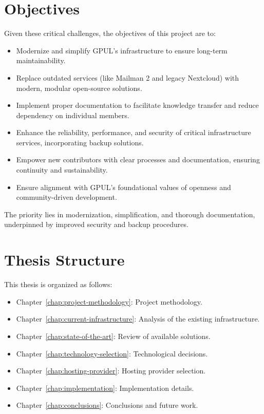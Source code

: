 \section{Objectives}

Given these critical challenges, the objectives of this project are to:

\begin{itemize}
    \item Modernize and simplify GPUL's infrastructure to ensure long-term maintainability.
    \item Replace outdated services (like Mailman 2 and legacy Nextcloud) with modern, modular open-source solutions.
    \item Implement proper documentation to facilitate knowledge transfer and reduce dependency on individual members.
    \item Enhance the reliability, performance, and security of critical infrastructure services, incorporating backup solutions.
    \item Empower new contributors with clear processes and documentation, ensuring continuity and sustainability.
    \item Ensure alignment with GPUL's foundational values of openness and community-driven development.
\end{itemize}

The priority lies in modernization, simplification, and thorough documentation, underpinned by improved security and backup procedures.

\section{Thesis Structure}

This thesis is organized as follows:
\begin{itemize}
    \item Chapter~\ref{chap:project-methodology}: Project methodology.
    \item Chapter~\ref{chap:current-infrastructure}: Analysis of the existing infrastructure.
    \item Chapter~\ref{chap:state-of-the-art}: Review of available solutions.
    \item Chapter~\ref{chap:technology-selection}: Technological decisions.
    \item Chapter~\ref{chap:hosting-provider}: Hosting provider selection.
    \item Chapter~\ref{chap:implementation}: Implementation details.
    \item Chapter~\ref{chap:conclusions}: Conclusions and future work.
\end{itemize}
